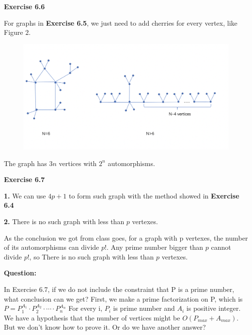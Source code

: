 \documentclass{article} %
\begin{document}
	\textbf{Exercise 6.6}\par
	For graphs in \textbf{Exercise 6.5}, we just need to add cherries for every vertex, like Figure $2$.
	\begin{figure}[H]
  	\centering
  	\includegraphics[scale=0.4]{66.png}
  	\caption{}
  	\label{fig:7}
  	\end{figure}
	The graph has $3n$ vertices with $2^{n}$ automorphisms.\par
	
	\textbf{Exercise 6.7}\par
	\textbf{1.} We can use $4p+1$ to form such graph with the method showed in \textbf{Exercise 6.4}\par
	\textbf{2.} There is no such graph with less than $p$ vertexes. \par
	As the conclusion we got from class goes, for a graph with p vertexes, the number of its automorphisms can divide $p!$. Any prime number bigger than $p$ cannot divide $p!$, so There is no such graph with less than $p$ vertexes. \par

	
	\textbf{Question:}\par
	In Exercise 6.7, if we do not include the constraint that P is a prime number, what conclusion can we get? First, we make a prime factorization on P, which is $P=P_1^{A_1}\cdot P_2^{A_2}\cdot \cdots \cdot P_n^{A_n}$
  	For every i, $P_i$ is prime number and $A_i$ is positive integer.
	We have a hypothesis that the number of vertices might be $O(P_{max}+A_{max})$. But we don’t know how to prove it. Or do we have another answer?
\end{document}
